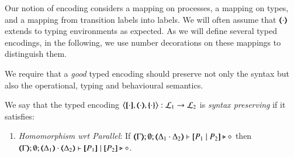 Our notion of encoding considers a mapping on processes, 
a mapping on types, 
and a mapping
from transition labels 
into labels.
We will often assume that  $(\!\!\langle\cdot\rangle\!\!)$ extends to typing
environments as expected.
As we will define several typed encodings,  
in the following, we use number decorations on these 
mappings to distinguish them.

We require that a {\em good} typed encoding should 
preserve not only the syntax but
also the operational, typing and behavioural
semantics. 

\begin{definition}\rm
	\label{def:sep}
	We say that 
	the typed encoding 
	$\enco{\map{\cdot}, \mapt{\cdot}, \mapa{\cdot}}: \tyl{L}_1 \to \tyl{L}_2$ is \emph{syntax preserving}
	if it satisfies:
	
	\begin{enumerate}[1.]
		\item	\emph{Homomorphism wrt Parallel}: If 
		$\mapt{\Gamma}; \emptyset; \mapt{\Delta_1 \cat \Delta_2} \proves \map{P_1 \Par P_2} \hastype \Proc$
		then \\
		$\mapt{\Gamma}; \emptyset; \mapt{\Delta_1} \cat \mapt{\Delta_2} \proves \map{P_1} \Par \map{P_2} \hastype \Proc$.
		
	\end{enumerate}
\end{definition}

